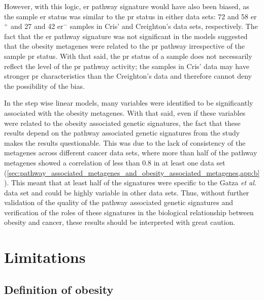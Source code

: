 However, with this logic, \gls{er} pathway signature would have also been biased, as the  sample  \gls{er} status was similar to the \gls{pr} status in either data sets: 72 and 58 \gls{er}$^+$ and 27 and 42 \gls{er}$^-$ samples in Cris' and Creighton's data sets, respectively.
The fact that the \gls{er} pathway signature was not significant in the models suggested that the obesity metagenes were related to the \gls{pr} pathway irrespective of the sample \gls{pr} status.
With that said, the \gls{pr} status of a sample does not necessarily reflect the level of the \gls{pr} pathway activity; the samples in Cris' data may have stronger \gls{pr} characteristics than the Creighton's data and therefore cannot deny the possibility of the bias.

In the step wise linear models, many variables were identified to be significantly associated with the obesity metagenes.
With that said, even if these variables were related to the obesity associated genetic signatures, the fact that these results depend on the pathway associated genetic signatures from the \citet{Gatza2010a} study makes the results questionable.
This was due to the lack of consistency of the metagenes across different cancer data sets, where more than half of the pathway metagenes showed a correlation of less than 0.8 in at least one data set (\cref{sec:pathway_associated_metagenes_and_obesity_associated_metagenes,app:b}).
This meant that at least half of the signatures were specific to the Gatza \textit{et al.} data set and could be highly variable in other data sets.
Thus, without further validation of the quality of the pathway associated genetic signatures and verification of the roles of these signatures in the biological relationship between obesity and cancer, these results should be interpreted with great caution.

\section{Limitations}
\label{sec:limitations}


\subsection{Definition of obesity}
\label{sub:discussion_definition_of_obesity}

